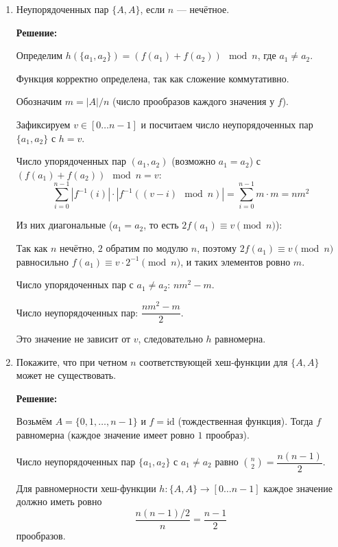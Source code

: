 \begin{enumerate}
\begin{enumerate}
    Так как $f$ равномерна, $|f^{-1}(i)| = |A|/n$ для всех $i$.
    Так как $g$ равномерна, $|g^{-1}(j)| = |B|/n$ для всех $j$.

    $$= \sum_{i=0}^{n-1} \frac{|A|}{n} \cdot \frac{|B|}{n} = n \cdot \frac{|A| \cdot |B|}{n^2} = \frac{|A| \cdot |B|}{n}$$

    Число прообразов не зависит от $v$, значит $h$ равномерна.

	  \item Неупорядоченных пар $\{ A, A \}$, если $n$ --- нечётное.
	  
    \textbf{Решение:}

    Определим $h(\{a_1, a_2\}) = (f(a_1) + f(a_2)) \mod n$, где $a_1 \neq a_2$.

    Функция корректно определена, так как сложение коммутативно.

    Обозначим $m = |A|/n$ (число прообразов каждого значения у $f$).

    Зафиксируем $v \in [0 \ldots n-1]$ и посчитаем число неупорядоченных пар $\{a_1, a_2\}$ с $h=v$.

    Число упорядоченных пар $(a_1, a_2)$ (возможно $a_1 = a_2$) с $(f(a_1) + f(a_2)) \mod n = v$:
    $$\sum_{i=0}^{n-1} |f^{-1}(i)| \cdot |f^{-1}((v - i) \mod n)| = \sum_{i=0}^{n-1} m \cdot m = nm^2$$

    Из них диагональные ($a_1 = a_2$, то есть $2f(a_1) \equiv v \pmod{n}$):

    Так как $n$ нечётно, $2$ обратим по модулю $n$, поэтому $2f(a_1) \equiv v \pmod{n}$ равносильно $f(a_1) \equiv v \cdot 2^{-1} \pmod{n}$, и таких элементов ровно $m$.

    Число упорядоченных пар с $a_1 \neq a_2$: $nm^2 - m$.

    Число неупорядоченных пар: $\dfrac{nm^2 - m}{2}$.

    Это значение не зависит от $v$, следовательно $h$ равномерна.

	  \item Покажите, что при четном $n$ соответствующей хеш-функции для $\{ A, A \}$ может не существовать.

    \textbf{Решение:}

    Возьмём $A = \{0, 1, \ldots, n-1\}$ и $f = \mathrm{id}$ (тождественная функция). Тогда $f$ равномерна (каждое значение имеет ровно $1$ прообраз).

    Число неупорядоченных пар $\{a_1, a_2\}$ с $a_1 \neq a_2$ равно $\binom{n}{2} = \dfrac{n(n-1)}{2}$.

    Для равномерности хеш-функции $h : \{A, A\} \to [0 \ldots n-1]$ каждое значение должно иметь ровно
    $$\frac{n(n-1)/2}{n} = \frac{n-1}{2}$$
    прообразов.


\end{enumerate}
\end{enumerate}
